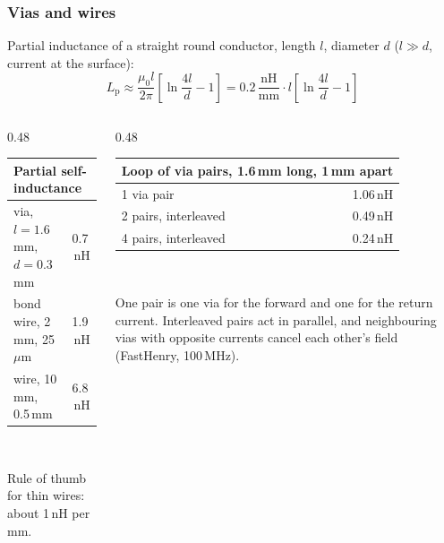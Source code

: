 \begin{frame}
	\frametitle{Vias and wires}
	Partial inductance of a straight round conductor, length $l$, diameter $d$ ($l\gg d$, current at the surface):
	\begin{equation*}
		L_\mathrm{p}\approx\frac{\mu_0 l}{2\pi}\left[\ln\frac{4l}{d}-1\right]=0.2\,\frac{\mathrm{nH}}{\mathrm{mm}}\cdot l\left[\ln\frac{4l}{d}-1\right]
	\end{equation*}
	\begin{columns}[T]
		\begin{column}{0.48\textwidth}
			\centering
			\small
			\begin{tabular}{|l|r|}
				\hline
				\multicolumn{2}{|l|}{\textbf{Partial self-inductance}} \\
				\hline
				via, $l=1.6$\,mm, $d=0.3$\,mm      & 0.7\,nH \\
				bond wire, 2\,mm, 25\,$\mu$m        & 1.9\,nH \\
				wire, 10\,mm, 0.5\,mm              & 6.8\,nH \\
				\hline
			\end{tabular}\\[0.6em]
			\raggedright
			Rule of thumb for thin wires: about 1\,nH per mm.
		\end{column}
		\begin{column}{0.48\textwidth}
			\centering
			\small
			\begin{tabular}{|l|r|}
				\hline
				\multicolumn{2}{|l|}{\textbf{Loop of via pairs, 1.6\,mm long, 1\,mm apart}} \\
				\hline
				1 via pair                         & 1.06\,nH \\
				2 pairs, interleaved               & 0.49\,nH \\
				4 pairs, interleaved               & 0.24\,nH \\
				\hline
			\end{tabular}\\[0.6em]
			\raggedright
			One pair is one via for the forward and one for the return current. Interleaved pairs act in parallel, and neighbouring vias with opposite currents cancel each other's field (FastHenry, 100\,MHz).
		\end{column}
	\end{columns}
\end{frame}

